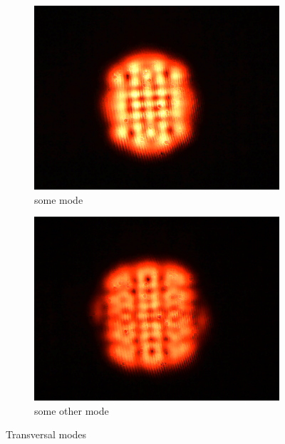 \documentclass{scrartcl}
\begin{document}
\begin{figure}[!htb]
    \centering
    \begin{subfigure}{0.45\textwidth}
      \centering
      \includegraphics[width = 1.2 \textwidth]{BilderFleck/2.png}
      \caption{some mode}
      \label{fig:modeA}
    \end{subfigure}
    \hfill
    \begin{subfigure}{0.45\textwidth}
      \centering
      \includegraphics[width = 1.2 \textwidth]{BilderFleck/bilder.png}
      \caption{some other mode}
      \label{fig:modeB}
    \end{subfigure}
    \caption{Transversal modes}
    \label{fig:transversalModes}
\end{figure}
\FloatBarrier
\end{document}
